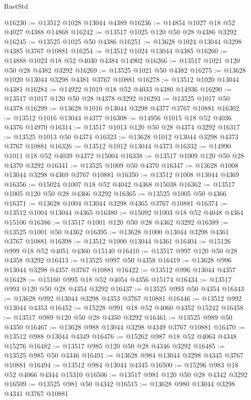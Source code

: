 \begin{lexlean}{RustStd}
\begin{coremodule}
@16230 := @13512 @1028 @13044 @4389
@16236 := @14854 @1027 @18 @52 @4027 @4388 @14868
@16242 := @13517 @1025 @120 @50 @28 @4386 @3292
@16245 := @13525 @1025 @50 @4386
@16251 := @13628 @1024 @13044 @3298 @4385 @3767 @10881
@16254 := @13512 @1024 @13044 @4385
@16260 := @14888 @1023 @18 @52 @4030 @4384 @14902
@16266 := @13517 @1021 @120 @50 @28 @4382 @3292
@16269 := @13525 @1021 @50 @4382
@16275 := @13628 @1020 @13044 @3298 @4381 @3767 @10881
@16278 := @13512 @1020 @13044 @4381
@16284 := @14922 @1019 @18 @52 @4033 @4380 @14936
@16290 := @13517 @1017 @120 @50 @28 @4378 @3292
@16293 := @13525 @1017 @50 @4378
@16299 := @13628 @1016 @13044 @3298 @4377 @3767 @10881
@16302 := @13512 @1016 @13044 @4377
@16308 := @14956 @1015 @18 @52 @4036 @4376 @14970
@16314 := @13517 @1013 @120 @50 @28 @4374 @3292
@16317 := @13525 @1013 @50 @4374
@16323 := @13628 @1012 @13044 @3298 @4373 @3767 @10881
@16326 := @13512 @1012 @13044 @4373
@16332 := @14990 @1011 @18 @52 @4039 @4372 @15004
@16338 := @13517 @1009 @120 @50 @28 @4370 @3292
@16341 := @13525 @1009 @50 @4370
@16347 := @13628 @1008 @13044 @3298 @4369 @3767 @10881
@16350 := @13512 @1008 @13044 @4369
@16356 := @15024 @1007 @18 @52 @4042 @4368 @15038
@16362 := @13517 @1005 @120 @50 @28 @4366 @3292
@16365 := @13525 @1005 @50 @4366
@16371 := @13628 @1004 @13044 @3298 @4365 @3767 @10881
@16374 := @13512 @1004 @13044 @4365
@16380 := @15092 @1003 @18 @52 @4048 @4364 @15106
@16386 := @13517 @1001 @120 @50 @28 @4362 @3292
@16389 := @13525 @1001 @50 @4362
@16395 := @13628 @1000 @13044 @3298 @4361 @3767 @10881
@16398 := @13512 @1000 @13044 @4361
@16404 := @15126 @999 @18 @52 @4051 @4360 @15140
@16410 := @13517 @997 @120 @50 @28 @4358 @3292
@16413 := @13525 @997 @50 @4358
@16419 := @13628 @996 @13044 @3298 @4357 @3767 @10881
@16422 := @13512 @996 @13044 @4357
@16428 := @15160 @995 @18 @52 @4054 @4356 @15174
@16434 := @13517 @993 @120 @50 @28 @4354 @3292
@16437 := @13525 @993 @50 @4354
@16443 := @13628 @992 @13044 @3298 @4353 @3767 @10881
@16446 := @13512 @992 @13044 @4353
@16452 := @15228 @991 @18 @52 @4060 @4352 @15242
@16458 := @13517 @989 @120 @50 @28 @4350 @3292
@16461 := @13525 @989 @50 @4350
@16467 := @13628 @988 @13044 @3298 @4349 @3767 @10881
@16470 := @13512 @988 @13044 @4349
@16476 := @15262 @987 @18 @52 @4063 @4348 @15276
@16482 := @13517 @985 @120 @50 @28 @4346 @3292
@16485 := @13525 @985 @50 @4346
@16491 := @13628 @984 @13044 @3298 @4345 @3767 @10881
@16494 := @13512 @984 @13044 @4345
@16500 := @15296 @983 @18 @52 @4066 @4344 @15310
@16506 := @13517 @981 @120 @50 @28 @4342 @3292
@16509 := @13525 @981 @50 @4342
@16515 := @13628 @980 @13044 @3298 @4341 @3767 @10881

\end{coremodule}
\end{lexlean}
